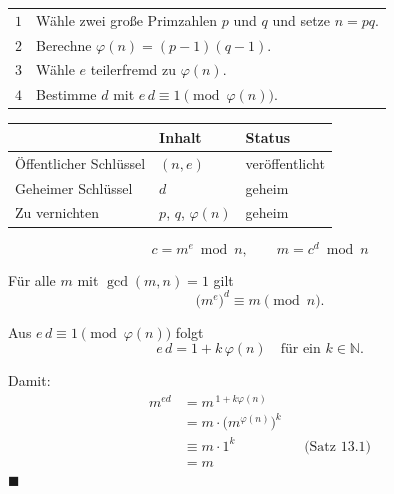 \begin{merksatz}
\begin{center}
{\small
\renewcommand{\arraystretch}{1.5}
\begin{tabular}{@{}P{1.0cm}P{7.4cm}@{}}
\toprule
$1$ & Wähle zwei große Primzahlen $p$ und $q$ und setze $n = pq$.\\
$2$ & Berechne $\varphi(n) = (p-1)(q-1)$.\\
$3$ & Wähle $e$ teilerfremd zu $\varphi(n)$.\\
$4$ & Bestimme $d$ mit $e\,d \equiv 1 \pmod{\varphi(n)}$.\\
\bottomrule
\end{tabular}}
\end{center}

\begin{center}
\renewcommand{\arraystretch}{1.5}
\begin{tabular}{@{}P{2.6cm}P{2.4cm}P{2.8cm}@{}}
\toprule
& \textbf{Inhalt} & \textbf{Status}\\
\midrule
Öffentlicher Schlüssel & $(n,e)$ & \textcolor{gruen}{veröffentlicht}\\
Geheimer Schlüssel & $d$ & \textcolor{akzent}{geheim}\\
Zu vernichten & $p$, $q$, $\varphi(n)$ & \textcolor{akzent}{geheim}\\
\bottomrule
\end{tabular}
\end{center}

\[ c = m^{e} \bmod n, \qquad m = c^{d} \bmod n \]
\end{merksatz}

\begin{merksatz}
Für alle $m$ mit $\gcd(m,n)=1$ gilt
\[ \bigl(m^{e}\bigr)^{d} \equiv m \pmod n . \]

Aus $e\,d \equiv 1 \pmod{\varphi(n)}$ folgt
\[ e\,d = 1 + k\,\varphi(n) \quad\text{für ein } k\in\mathbb{N} . \]

Damit:
\begin{align*}
m^{ed} &= m^{\,1+k\varphi(n)}\\
&= m\cdot\bigl(m^{\varphi(n)}\bigr)^{k}\\
&\equiv m\cdot 1^{k} && \text{(Satz 13.1)}\\
&= m
\end{align*}
$\blacksquare$

\begin{center}
\begin{minipage}{0.88\textwidth}
\end{minipage}
\end{center}
\end{merksatz}

